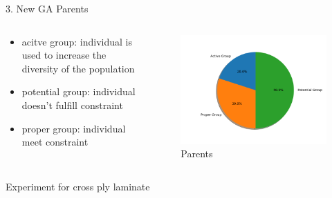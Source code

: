\documentclass{beamer}
\begin{document}
\begin{frame}{3. New GA Parents}
    \begin{columns}[c]
    \begin{column}{0.5\textwidth}
		\begin{itemize}
			\item acitve group: individual is used to increase the diversity of the population
			\item potential group: individual doesn't fulfill constraint
			\item proper group: individual meet constraint
		\end{itemize}
    \end{column}
	\begin{column}{0.5\textwidth}
		\begin{figure}
			\caption{Parents}
			\includegraphics[scale=0.5]{fig/chapter2_figure_group_pie.png}
		\end{figure}
	\end{column}
\end{columns}
\end{frame}


\begin{frame}{Experiment for  cross ply laminate}
	
\end{frame}
\end{document}
